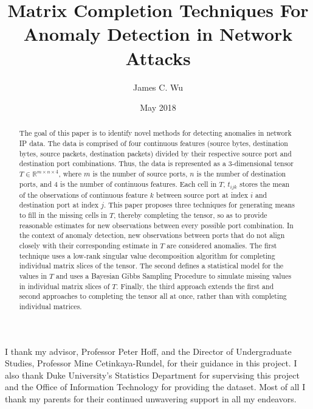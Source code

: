 \documentclass[12pt,twoside]{dukestatscithesis}
\title{Matrix Completion Techniques For Anomaly Detection in Network Attacks}
\author{James C. Wu}
\date{May 2018}
\theoremstyle{definition}
\theoremstyle{definition}
\theoremstyle{definition}
\theoremstyle{remark}
\begin{document}
  \maketitle

\frontmatter %
\pagestyle{empty} %
  \begin{acknowledgements}
    I thank my advisor, Professor Peter Hoff, and the Director of
    Undergraduate Studies, Professor Mine Cetinkaya-Rundel, for their
    guidance in this project. I also thank Duke University's Statistics
    Department for supervising this project and the Office of Information
    Technology for providing the dataset. Most of all I thank my parents for
    their continued unwavering support in all my endeavors.
  \end{acknowledgements}

  \hypersetup{linkcolor=black}
  \setcounter{tocdepth}{2}
  \tableofcontents


  \begin{abstract}
    The goal of this paper is to identify novel methods for detecting
    anomalies in network IP data. The data is comprised of four continuous
    features (source bytes, destination bytes, source packets, destination
    packets) divided by their respective source port and destination port
    combinations. Thus, the data is represented as a 3-dimensional tensor
    \(T \in \mathbb{R}^{m \times n \times 4}\), where \(m\) is the number of
    source ports, \(n\) is the number of destination ports, and \(4\) is the
    number of continuous features. Each cell in \(T\), \(t_{ijk}\) stores
    the mean of the observations of continuous feature \(k\) between source
    port at index \(i\) and destination port at index \(j\). This paper
    proposes three techniques for generating means to fill in the missing
    cells in \(T\), thereby completing the tensor, so as to provide
    reasonable estimates for new observations between every possible port
    combination. In the context of anomaly detection, new observations
    between ports that do not align closely with their corresponding
    estimate in \(T\) are considered anomalies. The first technique uses a
    low-rank singular value decomposition algorithm for completing
    individual matrix slices of the tensor. The second defines a statistical
    model for the values in \(T\) and uses a Bayesian Gibbs Sampling
    Procedure to simulate missing values in individual matrix slices of
    \(T\). Finally, the third approach extends the first and second
    approaches to completing the tensor all at once, rather than with
    completing individual matrices.
  \end{abstract}
\end{document}
